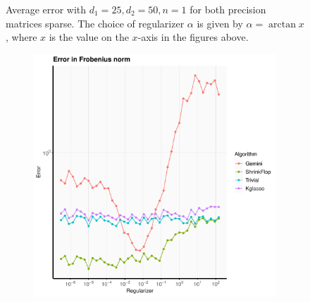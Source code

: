 \documentclass[aos]{imsart}
\theoremstyle{definition}
\numberwithin{equation}{section}
\begin{document}
\begin{figure}
\begin{subfigure}[b]{.4\textwidth}
         \end{subfigure}
\caption{Average error with $d_1 = 25, d_2 = 50, n = 1$ for both precision matrices sparse.  
The choice of regularizer $\alpha$ is given by $\alpha = \arctan{x}$, where $x$ is the value on the $x$-axis in the figures above.}\label{fig:sparse-ii}
\end{figure}


\begin{figure}
         \centering
                       \begin{subfigure}[b]{.4\textwidth}
         \includegraphics[width=\textwidth]{./code/zhou-comparison/25-50-sparse-frob.pdf}
         \end{subfigure}
         \begin{subfigure}[b]{.4\textwidth}

\end{subfigure}
\end{figure}
\end{document}
